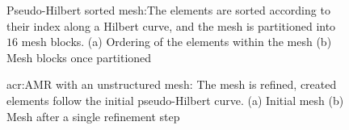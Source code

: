 



\begin{figure}[H]
	\centering
	\caption{Pseudo-Hilbert sorted mesh:The elements are sorted according to their index along a Hilbert curve, and the mesh is partitioned into \(16\) mesh blocks. (a) Ordering of the elements within the mesh (b) Mesh blocks once partitioned}\label{fig:mesh_hilbert}
\end{figure}


\begin{figure}[H]
	\centering
	\caption{\Acrlong{acr:AMR} with an unstructured mesh: The mesh is refined, created elements follow the initial pseudo-Hilbert curve. (a) Initial mesh (b) Mesh after a single refinement step}\label{fig:mesh_P0_adaptivity_far}
\end{figure}

